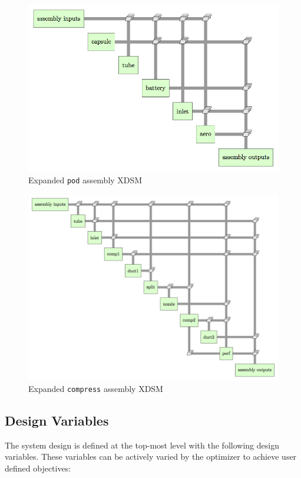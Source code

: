\documentclass[heading.tex]{subfiles}
\begin{document}
\begin{figure}[hbtp]
\centering
\includegraphics[width=\textwidth]{images/pod_assembly_xdsm.png}
\caption{Expanded \texttt{pod} assembly XDSM}
\label{f:podXDSM}
\end{figure}

\begin{figure}[hbtp]
\centering
\includegraphics[width=\textwidth]{images/compress_assembly_xdsm.png}
\caption{Expanded \texttt{compress} assembly XDSM}
\label{f:compressorXDSM}
\end{figure}

\subsection{Design Variables}
The system design is defined at the top-most level with the following design variables. These variables can be actively varied
 by the optimizer to achieve user defined objectives:
\end{document}
